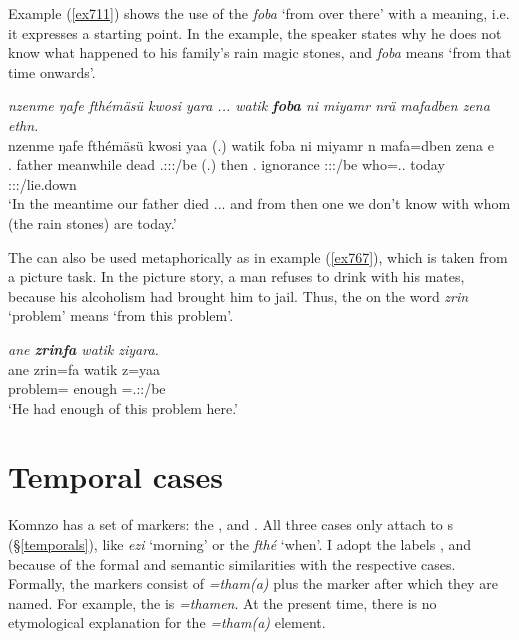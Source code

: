 Example (\ref{ex711}) shows the use of the   \emph{foba} `from over there' with a  meaning, i.e. it expresses a starting point. In the example, the speaker states why he does not know what happened to his family's rain magic stones, and \emph{foba} means `from that time onwards'.

\begin{exe}
	\ex \emph{nzenme ŋafe fthémäsü kwosi yara ... watik \textbf{foba} ni miyamr nrä mafadben zena ethn.}\\
	\gll nzenme ŋafe fthémäsü kwosi yaa (.) watik foba ni miyamr n mafa=dben zena e\\
	\Fnsg.\Poss{} father meanwhile dead \Tsg.\Masc:\Sbj:\Pst:\Ipfv/be (.) then \Dist.\Abl{} \Fnsg{} ignorance \Fpl:\Sbj:\Nonpast:\Ipfv/be who=\Loc.\Anim.\Nsg{} today \Stpl:\Sbj:\Nonpast:\Ipfv/lie.down\\
	\trans `In the meantime our father died ... and from then one we don't know with whom (the rain stones) are today.'
	\label{ex711}
\end{exe}

The  can also be used metaphorically as in example (\ref{ex767}), which is taken from a picture task. In the picture story, a man refuses to drink with his mates, because his alcoholism had brought him to jail. Thus, the  on the word \emph{zrin} `problem' means `from this problem'.

\begin{exe}
	\ex \emph{ane \textbf{zrinfa} watik ziyara.}\\
	\gll ane zrin=fa watik z=yaa\\
	\Dem{} problem=\Abl{} enough \Prox=\Tsg.\Masc:\Pst:\Ipfv/be\\
	\trans `He had enough of this problem here.'
	\label{ex767}
\end{exe}

\section{Temporal cases}\label{temporalcase}

Komnzo has a set of   markers: the  ,  and . All three  cases only attach to  s (\S{}\ref{temporals}), like \emph{ezi} `morning' or the  \emph{fthé} `when'. I adopt the labels ,  and  because of the formal and semantic similarities with the respective cases. Formally, the   markers consist of \emph{=tham(a)} plus the  marker after which they are named. For example, the   is \emph{=thamen}. At the present time, there is no etymological explanation for the \emph{=tham(a)} element.
   
